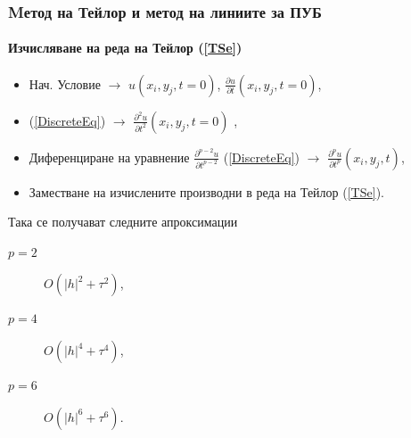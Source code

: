 \documentclass{beamer}
\newcommand{\rf}[1]{(\ref{#1})}
\begin{document}
\begin{frame}
\frametitle{Mетод на Тейлор и метод на линиите за ПУБ}
\framesubtitle{Изчисляване на реда на Тейлор \rf{TSe}}
\begin{itemize}
 \item Нач. Условие $\rightarrow$ $u(x_i, y_j, t=0)$, $\frac{ \partial u }{ \partial t }(x_i, y_j, t=0)$,
 \item \rf{DiscreteEq} $\rightarrow$ $\frac{ \partial^2 u }{ \partial t^2 }(x_i, y_j, t=0)$ ,
 \item Диференциране на уравнение $\frac{ \partial^{p-2} u }{ \partial t^{p-2} }$ \rf{DiscreteEq} $\rightarrow$  $\frac{ \partial^p u }{ \partial t^p }(x_i, y_j, t)$,
 \item Заместване на изчислените производни в реда на Тейлор \rf{TSe}.
\end{itemize}


Така се получават следните апроксимации
\begin{description}
 \item[$p=2$] $O(|h|^2 + \tau^2)$,
 \item[$p=4$] $O(|h|^4 + \tau^4)$,
 \item[$p=6$] $O(|h|^6 + \tau^6)$.
\end{description}

\end{frame}

\end{document}
